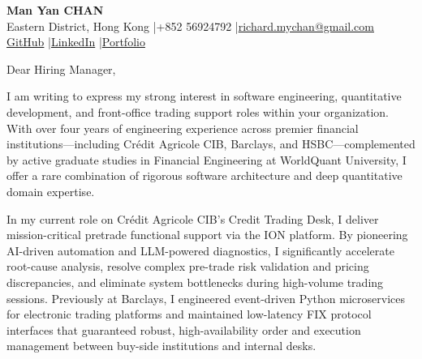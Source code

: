 \documentclass[10pt,a4paper]{article}
\begin{document}

\begin{center}
    {\Huge\bfseries Man Yan CHAN} \\ \vspace{1.5mm}
    Eastern District, Hong Kong \quad|\quad +852 56924792 \quad|\quad \href{mailto:richard.mychan@gmail.com}{richard.mychan@gmail.com} \\ \vspace{1mm}
    \href{https://github.com/manyan-chan}{GitHub} \quad|\quad \href{https://www.linkedin.com/in/richard-chanmy}{LinkedIn} \quad|\quad \href{https://manyan-chan.github.io}{Portfolio}
\end{center}

\vspace{4ex}


\noindent
Dear Hiring Manager,

\vspace{2ex}


\noindent
I am writing to express my strong interest in software engineering, quantitative development, and front-office trading support roles within your organization. With over four years of engineering experience across premier financial institutions—including Crédit Agricole CIB, Barclays, and HSBC—complemented by active graduate studies in Financial Engineering at WorldQuant University, I offer a rare combination of rigorous software architecture and deep quantitative domain expertise.

In my current role on Crédit Agricole CIB's Credit Trading Desk, I deliver mission-critical pretrade functional support via the ION platform. By pioneering AI-driven automation and LLM-powered diagnostics, I significantly accelerate root-cause analysis, resolve complex pre-trade risk validation and pricing discrepancies, and eliminate system bottlenecks during high-volume trading sessions. Previously at Barclays, I engineered event-driven Python microservices for electronic trading platforms and maintained low-latency FIX protocol interfaces that guaranteed robust, high-availability order and execution management between buy-side institutions and internal desks. 
\end{document}
